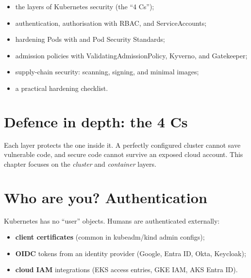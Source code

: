 
\begin{objectives}
\begin{itemize}
  \item the layers of Kubernetes security (the ``4 Cs'');
  \item authentication, authorisation with RBAC, and ServiceAccounts;
  \item hardening Pods with  and Pod Security Standards;
  \item admission policies with ValidatingAdmissionPolicy, Kyverno, and Gatekeeper;
  \item supply-chain security: scanning, signing, and minimal images;
  \item a practical hardening checklist.
\end{itemize}
\end{objectives}

\section{Defence in depth: the 4 Cs}

\begin{center}
\end{center}

Each layer protects the one inside it. A perfectly configured cluster cannot
save vulnerable code, and secure code cannot survive an exposed cloud account.
This chapter focuses on the \emph{cluster} and \emph{container} layers.

\section{Who are you? Authentication}

Kubernetes has no ``user'' objects. Humans are authenticated externally:

\begin{itemize}
  \item \textbf{client certificates} (common in kubeadm/kind admin configs);
  \item \textbf{OIDC} tokens from an identity provider (Google, Entra ID, Okta, Keycloak);
  \item \textbf{cloud IAM} integrations (EKS access entries, GKE IAM, AKS Entra ID).
\end{itemize}

